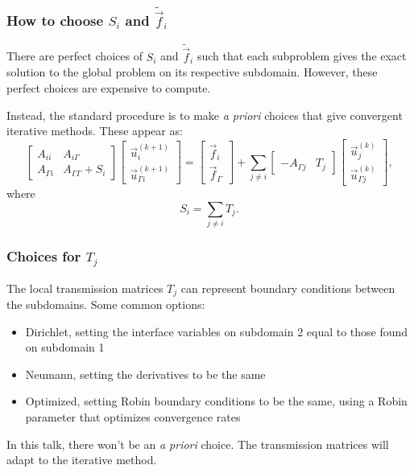 \documentclass{beamer}
\begin{document}
\begin{frame}
\frametitle{How to choose $S_i$ and $\tilde{\vec{f}}_i$}

There are perfect choices of $S_i$ and $\tilde{\vec{f}}_i$ such that each subproblem gives the exact solution to the global problem on its respective subdomain.
However, these perfect choices are expensive to compute.

Instead, the standard procedure is to make \textit{a priori} choices that give convergent iterative methods.
These appear as:
\begin{equation} \label{eq: iterative sub}
	\begin{bmatrix}
		A_{ii} & A_{i \Gamma} \\
		A_{\Gamma i} & A_{\Gamma \Gamma} + S_i
	\end{bmatrix}
	\begin{bmatrix} \vec{u}_i^{(k+1)} \\ \vec{u}_{\Gamma i}^{(k+1)} \end{bmatrix}
	=
	\begin{bmatrix} \vec{f}_i \\ \vec{f}_\Gamma \end{bmatrix}
	+ \sum_{j \neq i}
	\begin{bmatrix} ~ \\ -A_{\Gamma j} & T_j \end{bmatrix}
	\begin{bmatrix} \vec{u}_j^{(k)} \\ \vec{u}_{\Gamma j}^{(k)} \end{bmatrix},
\end{equation}
where
\begin{equation} \label{eq: local to global transmission}
	S_i = \sum_{j \neq i} T_j.
\end{equation}
\end{frame}

\begin{frame}
\frametitle{Choices for $T_j$}

The local transmission matrices $T_j$ can represent boundary conditions between the subdomains.
Some common options:
\begin{itemize}
\item Dirichlet, setting the interface variables on subdomain 2 equal to those found on subdomain 1
\item Neumann, setting the derivatives to be the same
\item Optimized, setting Robin boundary conditions to be the same, using a Robin parameter that optimizes convergence rates
\end{itemize}

In this talk, there won't be an \textit{a priori} choice.
The transmission matrices will adapt to the iterative method.

\end{frame}
\end{document}
